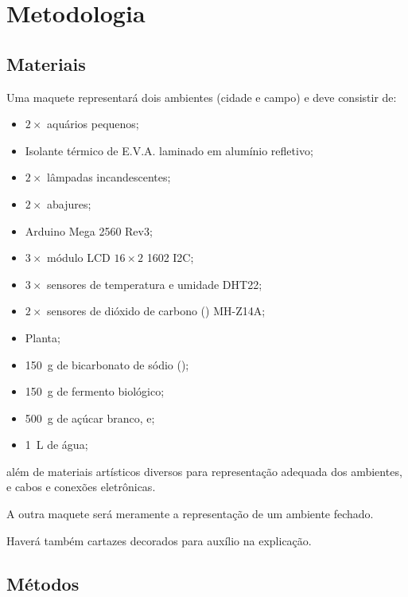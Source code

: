 \documentclass[article,11pt,oneside,a4paper,
	english,	%
	brazil,		%
	sumario=tradicional]{abntex2}
\begin{document}
\section{Metodologia}

\subsection{Materiais}

Uma maquete representará dois ambientes (cidade e campo) e deve consistir de:
\begin{itemize}
	\item $ 2\times $ aquários pequenos;
	\item Isolante térmico de E.V.A. laminado em alumínio refletivo;
	\item $ 2\times $ lâmpadas incandescentes;
	\item $ 2\times $ abajures;
	\item Arduino Mega 2560 Rev3;
	\item $ 3\times $ módulo LCD $ 16\times2 $ 1602 I2C;
	\item $ 3\times $ sensores de temperatura e umidade DHT22;
	\item $ 2\times $ sensores de dióxido de carbono () MH-Z14A;
	\item Planta;
	\item \SI{150}{\gram} de bicarbonato de sódio ();
	\item \SI{150}{\gram} de fermento biológico;
	\item \SI{500}{\gram} de açúcar branco, e;
	\item \SI{1}{\liter} de água;
\end{itemize}
além de materiais artísticos diversos para representação adequada dos ambientes, e cabos e conexões eletrônicas.

A outra maquete será meramente a representação de um ambiente fechado.

Haverá também cartazes decorados para auxílio na explicação.

\subsection{Métodos}
\end{document}
